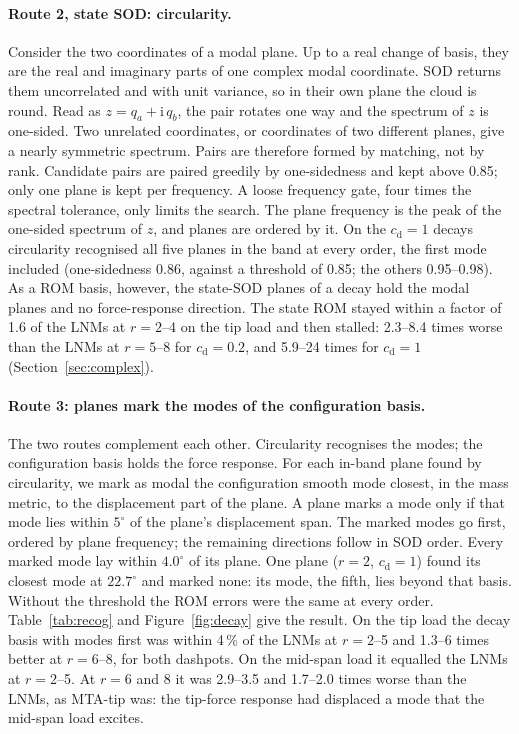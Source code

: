 \documentclass[preprint,12pt]{elsarticle}
\begin{document}
\paragraph{Route 2, state SOD: circularity.} Consider the two coordinates of a modal plane. Up to a real change of basis, they are the real and imaginary parts of one complex modal coordinate. SOD returns them uncorrelated and with unit variance, so in their own plane the cloud is round. Read as $z=q_a+\mathrm i\,q_b$, the pair rotates one way and the spectrum of $z$ is one-sided. Two unrelated coordinates, or coordinates of two different planes, give a nearly symmetric spectrum.
Pairs are therefore formed by matching, not by rank. Candidate pairs are paired greedily by one-sidedness and kept above 0.85; only one plane is kept per frequency. A loose frequency gate, four times the spectral tolerance, only limits the search. The plane frequency is the peak of the one-sided spectrum of $z$, and planes are ordered by it.
On the $c_{\mathrm d}=1$ decays circularity recognised all five planes in the band at every order, the first mode included (one-sidedness 0.86, against a threshold of 0.85; the others 0.95--0.98). As a ROM basis, however, the state-SOD planes of a decay hold the modal planes and no force-response direction. The state ROM stayed within a factor of 1.6 of the LNMs at $r=2$--4 on the tip load and then stalled: 2.3--8.4 times worse than the LNMs at $r=5$--8 for $c_{\mathrm d}=0.2$, and 5.9--24 times for $c_{\mathrm d}=1$ (Section~\ref{sec:complex}).

\paragraph{Route 3: planes mark the modes of the configuration basis.} The two routes complement each other. Circularity recognises the modes; the configuration basis holds the force response. For each in-band plane found by circularity, we mark as modal the configuration smooth mode closest, in the mass metric, to the displacement part of the plane. A plane marks a mode only if that mode lies within $5^\circ$ of the plane's displacement span. The marked modes go first, ordered by plane frequency; the remaining directions follow in SOD order.
Every marked mode lay within $4.0^\circ$ of its plane. One plane ($r=2$, $c_{\mathrm d}=1$) found its closest mode at $22.7^\circ$ and marked none: its mode, the fifth, lies beyond that basis. Without the threshold the ROM errors were the same at every order.
Table~\ref{tab:recog} and Figure~\ref{fig:decay} give the result. On the tip load the decay basis with modes first was within 4\,\% of the LNMs at $r=2$--5 and 1.3--6 times better at $r=6$--8, for both dashpots. On the mid-span load it equalled the LNMs at $r=2$--5. At $r=6$ and 8 it was 2.9--3.5 and 1.7--2.0 times worse than the LNMs, as MTA-tip was: the tip-force response had displaced a mode that the mid-span load excites.
\end{document}
